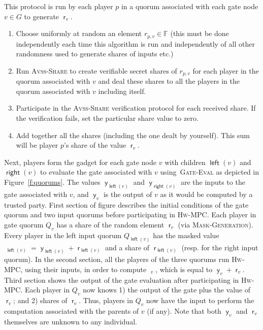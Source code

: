\documentclass[10pt]{llncs}
\newcommand{\F}{\mathbb{F}}
\newcommand{\vssSh}{\textsc{Avss-Share}\xspace}
\newcommand{\hw}{\textsc{Hw-MPC}\xspace}
\newcommand{\gm}{\textsc{Mask-Generation}\xspace}
\newcommand{\gcomp}{\textsc{Gate-Eval}\xspace}
\DeclareMathOperator{\vl}{\mathsf{y}}
\DeclareMathOperator{\mask}{\mathsf{r}}
\DeclareMathOperator{\mv}{\mathsf{\hat{y}}}
\DeclareMathOperator{\lef}{\mathsf{left}}
\DeclareMathOperator{\rit}{\mathsf{right}}
\begin{document}
\begin{algorithm}
\caption{\gm}\label{alg:rand}
This protocol is run by each player $p$ in a quorum associated with each gate node $v \in G$ to generate $\mask_v$.
\begin{enumerate}
\item Choose uniformly at random an element $r_{p,v} \in \F$ (this must be done independently each time this algorithm is run and independently of all other randomness used to generate shares of inputs etc.)
\item Run \vssSh to create verifiable secret shares of $r_{p,v}$ for each player in the quorum associated with $v$ and deal these shares to all the players in the quorum associated with $v$ including itself.
\item Participate in the \vssSh verification protocol for each received share. If the verification fails, set the particular share value to zero. 
\item Add together all the shares (including the one dealt by yourself).  This sum will be player $p$'s share of the value $\mask_v$. 
\end{enumerate}
\end{algorithm}

Next, players form the gadget for each gate node $v$ with children
$\lef(v)$ and $\rit(v)$ to evaluate the gate associated with $v$
using~\gcomp as depicted in Figure~\ref{f:quorums}. The values
$\vl_{\lef(v)}$ and $\vl_{\rit(v)}$ are the inputs to the gate
associated with $v$, and $\vl_v$ is the output of $v$ as it would be
computed by a trusted party. First section of figure describes the
initial conditions of the gate quorum and two input quorums before
participating in \hw. Each player in gate quorum $Q_v$ has a share of
the random element $\mask_v$ (via \gm). Every player in the left input
quorum $Q_{\lef(v)}$ has the masked value $\mv_{\lef(v)} =
\vl_{\lef(v)} + \mask_{\lef(v)}$ and a share of $\mask_{\lef(v)}$
(resp. for the right input quorum). In the second section, all the
players of the three quorums run \hw, using their inputs, in order to
compute $\mv_v$, which is equal to $\vl_v + \mask_v$. Third section shows
the output of the gate evaluation after participating in \hw. Each
player in $Q_v$ now knows 1) the output of the gate plus
the value of $\mask_v$; and 2) shares of $\mask_v$. Thus, players in
$Q_v$ now have the input to perform the computation associated with
the parents of $v$ (if any). Note that both $\vl_v$ and $\mask_v$
themselves are unknown to any individual.
 
\end{document}
